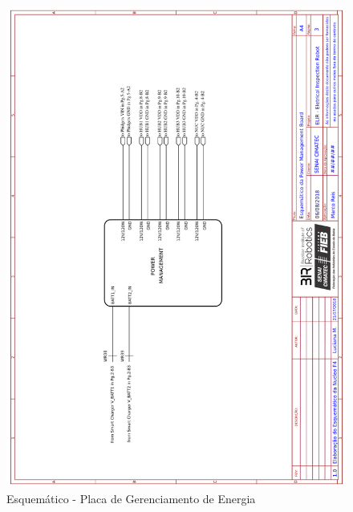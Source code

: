     \begin{figure}[h]
	\centering
	\includegraphics[width=14cm]{Figures/EsquematicoPMB.png}
	\caption{Esquemático - Placa de Gerenciamento de Energia} \label{PMB}
	\end{figure}
	
    \pagebreak

